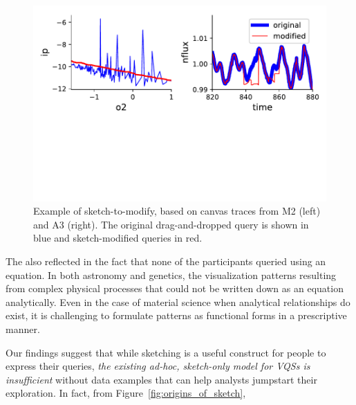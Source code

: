  \begin{figure}[h!]
     \centering
     \includegraphics[width=\columnwidth]{figures/QueryModificationBySketch.pdf}
     \caption{Example of sketch-to-modify, based on canvas traces from M2 (left) and A3 (right). The original drag-and-dropped query is shown in blue and sketch-modified queries in red.}%
     \label{query_modification}
     \vspace{-10pt}
 \end{figure}
 \par The  also reflected in the fact
 that none of the participants queried using an equation.
 In both astronomy and genetics, the visualization patterns
 resulting from complex physical processes
 that could not be written down as an equation analytically.
 Even in the case of material science when analytical
 relationships do exist, it is challenging to formulate patterns as functional forms in a prescriptive manner.
 \par Our findings suggest that while sketching
 is a useful construct for people to express their queries,
 \emph{the existing ad-hoc, sketch-only model for VQSs
 is insufficient } without data examples
 that can help analysts jumpstart their exploration.
 In fact, from Figure~\ref{fig:origins_of_sketch},
